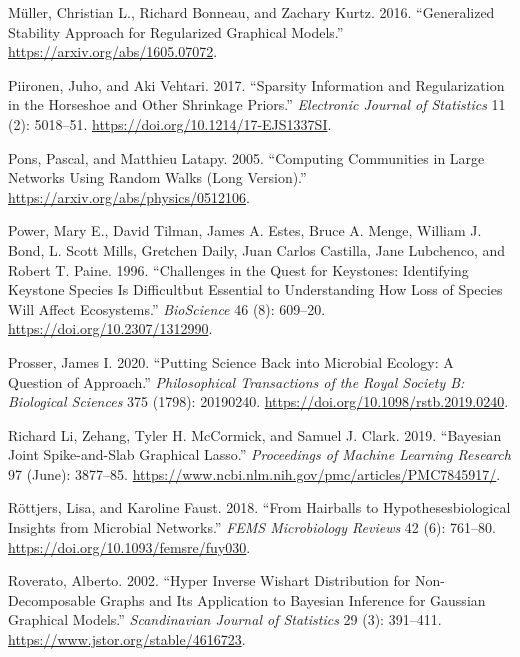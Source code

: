\documentclass[
  a4paper,
]{article}
\newlength{\cslhangindent}
\newlength{\cslentryspacingunit} %
\newenvironment{CSLReferences}[2] %
 {%
  \setlength{\parindent}{0pt}
  \ifodd #1
  \let\oldpar\par
  \def\par{\hangindent=\cslhangindent\oldpar}
  \fi
  \setlength{\parskip}{#2\cslentryspacingunit}
 }%
 {}
\begin{document}
\begin{CSLReferences}{1}{0}
\leavevmode{}%
Müller, Christian L., Richard Bonneau, and Zachary Kurtz. 2016.
{``Generalized Stability Approach for Regularized Graphical Models.''}
\url{https://arxiv.org/abs/1605.07072}.

\leavevmode{}%
Piironen, Juho, and Aki Vehtari. 2017. {``Sparsity Information and
Regularization in the Horseshoe and Other Shrinkage Priors.''}
\emph{Electronic Journal of Statistics} 11 (2): 5018--51.
\url{https://doi.org/10.1214/17-EJS1337SI}.

\leavevmode{}%
Pons, Pascal, and Matthieu Latapy. 2005. {``Computing Communities in
Large Networks Using Random Walks (Long Version).''}
\url{https://arxiv.org/abs/physics/0512106}.

\leavevmode{}%
Power, Mary E., David Tilman, James A. Estes, Bruce A. Menge, William J.
Bond, L. Scott Mills, Gretchen Daily, Juan Carlos Castilla, Jane
Lubchenco, and Robert T. Paine. 1996. {``Challenges in the Quest for
Keystones: Identifying Keystone Species Is Difficult{\textemdash}but
Essential to Understanding How Loss of Species Will Affect
Ecosystems.''} \emph{BioScience} 46 (8): 609--20.
\url{https://doi.org/10.2307/1312990}.

\leavevmode{}%
Prosser, James I. 2020. {``Putting Science Back into Microbial Ecology:
A Question of Approach.''} \emph{Philosophical Transactions of the Royal
Society B: Biological Sciences} 375 (1798): 20190240.
\url{https://doi.org/10.1098/rstb.2019.0240}.

\leavevmode{}%
Richard Li, Zehang, Tyler H. McCormick, and Samuel J. Clark. 2019.
{``Bayesian Joint Spike-and-Slab Graphical Lasso.''} \emph{Proceedings
of Machine Learning Research} 97 (June): 3877--85.
\url{https://www.ncbi.nlm.nih.gov/pmc/articles/PMC7845917/}.

\leavevmode{}%
Röttjers, Lisa, and Karoline Faust. 2018. {``From Hairballs to
Hypotheses{\textendash}biological Insights from Microbial Networks.''}
\emph{FEMS Microbiology Reviews} 42 (6): 761--80.
\url{https://doi.org/10.1093/femsre/fuy030}.

\leavevmode{}%
Roverato, Alberto. 2002. {``Hyper Inverse Wishart Distribution for
Non-Decomposable Graphs and Its Application to Bayesian Inference for
Gaussian Graphical Models.''} \emph{Scandinavian Journal of Statistics}
29 (3): 391--411. \url{https://www.jstor.org/stable/4616723}.


\end{CSLReferences}
\end{document}
